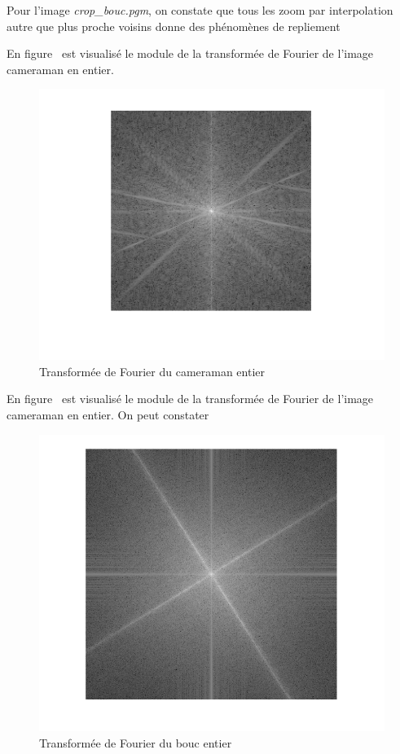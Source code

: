 \documentclass[12pt,a4paper,onecolumn]{article}
\begin{document}
Pour l'image \textit{crop\_bouc.pgm}, on constate que tous les zoom par interpolation autre que plus proche voisins donne des phénomènes de repliement

En figure~ est visualisé le module de la transformée de Fourier de l'image cameraman en entier.
\begin{figure}[H]
	\centering
	\includegraphics[height = 0.4\textheight]{cam_ff}
	\caption{Transformée de Fourier du cameraman entier}
	\label{fig_ff_cam}
\end{figure}

En figure~ est visualisé le module de la transformée de Fourier de l'image cameraman en entier. On peut constater
\begin{figure}[H]
	\centering
	\includegraphics[height = 0.4\textheight]{bouc_ff}
	\caption{Transformée de Fourier du bouc entier}
	\label{fig_bouc_ff}
\end{figure}
\end{document}
